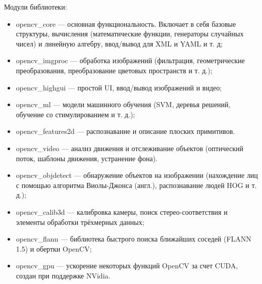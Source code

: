 Модули библиотеки:
\begin{itemize}
  \item opencv\_core — основная функциональность. Включает в себя базовые структуры, вычисления (математические функции, генераторы случайных чисел) и линейную алгебру, ввод/вывод для XML и YAML и т. д;
  \item opencv\_imgproc — обработка изображений (фильтрация, геометрические преобразования, преобразование цветовых пространств и т. д.);
  \item opencv\_highgui — простой UI, ввод/вывод изображений и видео;
  \item opencv\_ml — модели машинного обучения (SVM, деревья решений, обучение со стимулированием и т. д.);
  \item opencv\_features2d — распознавание и описание плоских примитивов.
  \item opencv\_video — анализ движения и отслеживание объектов (оптический поток, шаблоны движения, устранение фона).
  \item opencv\_objdetect — обнаружение объектов на изображении (нахождение лиц с помощью алгоритма Виолы-Джонса (англ.), распознавание людей HOG и т. д.);
  \item opencv\_calib3d — калибровка камеры, поиск стерео-соответствия и элементы обработки трёхмерных данных;
  \item opencv\_flann — библиотека быстрого поиска ближайших соседей (FLANN 1.5) и обертки OpenCV;
  \item opencv\_gpu — ускорение некоторых функций OpenCV за счет CUDA, создан при поддержке NVidia.
\end{itemize}
